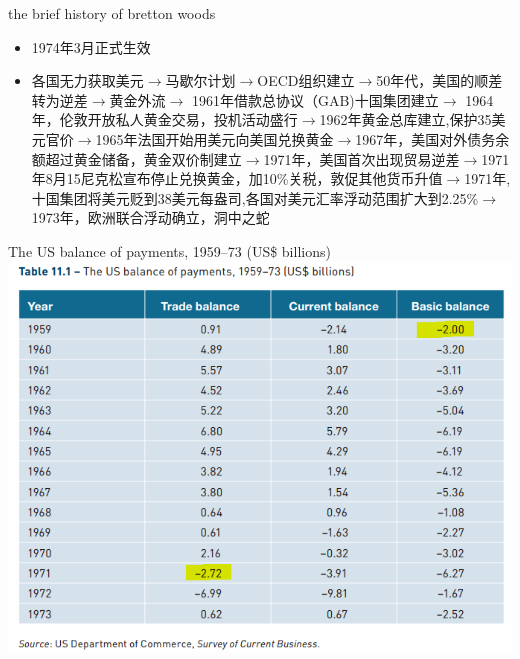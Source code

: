 \documentclass[10pt,hyperref={CJKbookmarks=true},xcolor=dvipsnames,aspectratio=169]{beamer}
\begin{document}
\begin{frame}{the brief history of bretton woods}
	\begin{itemize}
		\item 1974年3月正式生效
		\item 各国无力获取美元$\longrightarrow$马歇尔计划$\longrightarrow$OECD组织建立$\longrightarrow$50年代，美国的顺差转为逆差$\longrightarrow$黄金外流$\longrightarrow$ 1961年借款总协议（GAB)十国集团建立$\longrightarrow$ 1964年，伦敦开放私人黄金交易，投机活动盛行$\longrightarrow$1962年黄金总库建立,保护35美元官价$\longrightarrow$1965年法国开始用美元向美国兑换黄金$\longrightarrow$1967年，美国对外债务余额超过黄金储备，黄金双价制建立$\longrightarrow$1971年，美国首次出现贸易逆差$\longrightarrow$1971年8月15尼克松宣布停止兑换黄金，加10\%关税，敦促其他货币升值$\longrightarrow$1971年,十国集团将美元贬到38美元每盎司,各国对美元汇率浮动范围扩大到2.25\%$\longrightarrow$1973年，欧洲联合浮动确立，洞中之蛇
	\end{itemize}
\end{frame}
\begin{frame}{The US balance of payments, 1959–73 (US\$ billions)}
\centering
\includegraphics[scale=0.55]{fig/systems/usbop}
\end{frame}
\end{document}

